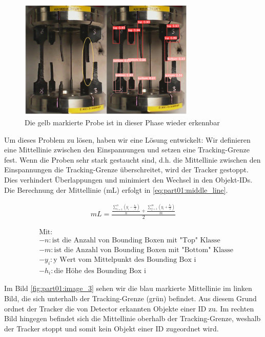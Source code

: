 \begin{figure}[!htbp]
 \centering
 \includegraphics[width=0.75\textwidth]{gfx/image_2.png}
 \caption{Die gelb markierte Probe ist in dieser Phase wieder erkennbar}
 \label{fig:part01:image_2}
\end{figure}

Um dieses Problem zu lösen, haben wir eine Lösung entwickelt: Wir definieren eine Mittellinie zwischen den Einspannungen und setzen eine Tracking-Grenze fest. Wenn die Proben sehr stark gestaucht sind, d.h. die Mittellinie zwischen den Einspannungen die Tracking-Grenze überschreitet­­­, wird der Tracker gestoppt. Dies verhindert Überlappungen und minimiert den Wechsel in den Objekt-IDs. Die Berechnung der Mittellinie (mL) erfolgt in \ref{eq:part01:middle_line}.

\begin{gather}
mL = \frac{\frac{\sum_{i=1}^{n} (y_i - \frac{h_i}{2})}{n} + \frac{\sum_{j=1}^{m} (y_i + \frac{h_j}{2})}{m}}{2}
\label{eq:part01:middle_line}
\end{gather}

\begin{align*}
& \text{Mit:} \\
& - n: \text{ist die Anzahl von Bounding Boxen mit "Top" Klasse} \\
& - m: \text{ist die Anzahl von Bounding Boxen mit "Bottom" Klasse} \\
& - y_i: \text{y Wert vom Mittelpunkt des Bounding Box i} \\
& - h_i: \text{die Höhe des Bounding Box i}
\end{align*}

Im Bild \ref{fig:part01:image_3} sehen wir die blau markierte Mittellinie im linken Bild, die sich unterhalb der Tracking-Grenze (grün) befindet. Aus diesem Grund ordnet der Tracker die von Detector erkannten Objekte einer ID zu. Im rechten Bild hingegen befindet sich die Mittellinie oberhalb der Tracking-Grenze, weshalb der Tracker stoppt und somit kein Objekt einer ID zugeordnet wird.

